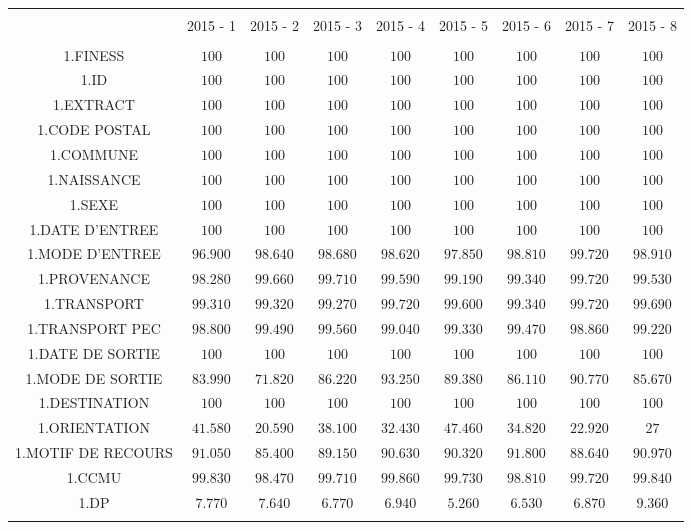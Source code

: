 \documentclass[]{article}
\begin{document}
\begin{table}[!htbp] \centering 
  \caption{} 
  \label{} 
\begin{tabular}{@{\extracolsep{5pt}} ccccccccc} 
\\[-1.8ex]\hline 
\hline \\[-1.8ex] 
 & 2015 - 1 & 2015 - 2 & 2015 - 3 & 2015 - 4 & 2015 - 5 & 2015 - 6 & 2015 - 7 & 2015 - 8 \\ 
\hline \\[-1.8ex] 
1.FINESS & $100$ & $100$ & $100$ & $100$ & $100$ & $100$ & $100$ & $100$ \\ 
1.ID & $100$ & $100$ & $100$ & $100$ & $100$ & $100$ & $100$ & $100$ \\ 
1.EXTRACT & $100$ & $100$ & $100$ & $100$ & $100$ & $100$ & $100$ & $100$ \\ 
1.CODE POSTAL & $100$ & $100$ & $100$ & $100$ & $100$ & $100$ & $100$ & $100$ \\ 
1.COMMUNE & $100$ & $100$ & $100$ & $100$ & $100$ & $100$ & $100$ & $100$ \\ 
1.NAISSANCE & $100$ & $100$ & $100$ & $100$ & $100$ & $100$ & $100$ & $100$ \\ 
1.SEXE & $100$ & $100$ & $100$ & $100$ & $100$ & $100$ & $100$ & $100$ \\ 
1.DATE D'ENTREE & $100$ & $100$ & $100$ & $100$ & $100$ & $100$ & $100$ & $100$ \\ 
1.MODE D'ENTREE & $96.900$ & $98.640$ & $98.680$ & $98.620$ & $97.850$ & $98.810$ & $99.720$ & $98.910$ \\ 
1.PROVENANCE & $98.280$ & $99.660$ & $99.710$ & $99.590$ & $99.190$ & $99.340$ & $99.720$ & $99.530$ \\ 
1.TRANSPORT & $99.310$ & $99.320$ & $99.270$ & $99.720$ & $99.600$ & $99.340$ & $99.720$ & $99.690$ \\ 
1.TRANSPORT PEC & $98.800$ & $99.490$ & $99.560$ & $99.040$ & $99.330$ & $99.470$ & $98.860$ & $99.220$ \\ 
1.DATE DE SORTIE & $100$ & $100$ & $100$ & $100$ & $100$ & $100$ & $100$ & $100$ \\ 
1.MODE DE SORTIE & $83.990$ & $71.820$ & $86.220$ & $93.250$ & $89.380$ & $86.110$ & $90.770$ & $85.670$ \\ 
1.DESTINATION & $100$ & $100$ & $100$ & $100$ & $100$ & $100$ & $100$ & $100$ \\ 
1.ORIENTATION & $41.580$ & $20.590$ & $38.100$ & $32.430$ & $47.460$ & $34.820$ & $22.920$ & $27$ \\ 
1.MOTIF DE RECOURS & $91.050$ & $85.400$ & $89.150$ & $90.630$ & $90.320$ & $91.800$ & $88.640$ & $90.970$ \\ 
1.CCMU & $99.830$ & $98.470$ & $99.710$ & $99.860$ & $99.730$ & $98.810$ & $99.720$ & $99.840$ \\ 
1.DP & $7.770$ & $7.640$ & $6.770$ & $6.940$ & $5.260$ & $6.530$ & $6.870$ & $9.360$ \\ 
\hline \\[-1.8ex] 
\end{tabular} 
\end{table}
\end{document}
